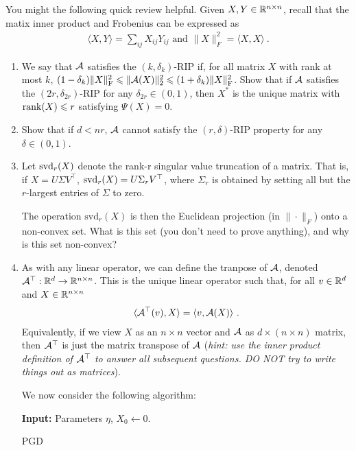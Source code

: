 \documentclass[12pt]{article}
\begin{document}
	You might the following quick review helpful. Given $X,Y \in \mathbb{R}^{n \times n}$, recall that the matix inner product and Frobenius can be expressed as
	\begin{eqnarray}
	\langle X, Y \rangle = \sum_{ij} X_{ij}Y_{ij} \text{ and } \|X\|_F^2 = \langle X,X\rangle~.
	\end{eqnarray}
	

	\begin{enumerate}
		\item We say that ${\cal A}$ satisfies the $(k,\delta_k)$-RIP if, for all matrix $X$ with rank at most $k$, $(1-\delta_k) \|X\|_{\mathrm{F}}^2 \leqslant\|{\cal A}(X)\|_2^2 \leqslant (1+\delta_k)\|X\|_{\mathrm{F}}^2$. 
		Show that if ${\cal A}$ satisfies the $(2r,\delta_{2r})$-RIP  for any $\delta_{2r} \in (0,1)$, then $X^*$ is the unique matrix with $\mathrm{rank}(X) \leqslant r$ satisfying $\Psi(X) = 0$.


		\item Show that if $d < nr$, ${\cal A}$ cannot satisfy the $(r,\delta)$-RIP property for any $\delta \in (0,1)$. 
		\item Let ${\mathrm{svd}}_r(X)$ denote the rank-r singular value truncation of a matrix. That is, if $X = U\Sigma V^{\top}$, ${\mathrm{svd}}_r(X) = U\Sigma_r V^{\top}$, where $\Sigma_r$ is obtained by setting all but the $r$-largest entries of $\Sigma$ to zero.

		The operation $\mathrm{svd}_r(X)$ is then the Euclidean projection (in $\|\cdot\|_F$) onto a non-convex set. What is this set (you don't need to prove anything), and why is this set non-convex? 

		\item As with any linear operator, we can define the tranpose of ${\cal A}$, denoted ${\cal A}^\top : \mathbb{R}^d \to \mathbb{R}^{n \times n}$. This is the unique linear operator such that, for all $v \in \mathbb{R}^d$ and $X \in \mathbb{R}^{n \times n}$
		\begin{eqnarray}
		\langle {\cal A}^\top(v), X \rangle = \langle v, {\cal A}(X) \rangle~.
		\end{eqnarray}
		Equivalently, if we view $X$ as an $n \times n$ vector and ${\cal A}$ as $d \times (n \times n)$ matrix, then ${\cal A}^{\top}$ is just the matrix transpose of ${\cal A}$ (\emph{hint: use the inner product definition of ${\cal A}^\top$ to answer all subsequent questions. DO NOT try to write things out as matrices}).

		We now consider the following algorithm:
		\begin{algorithm}
		\SetAlgoLined
		\textbf{Input:} Parameters $\eta$, $X_0 \leftarrow 0$.
		\caption{PGD}\label{algPGD}
		\end{algorithm}



\end{enumerate}
\end{document}
